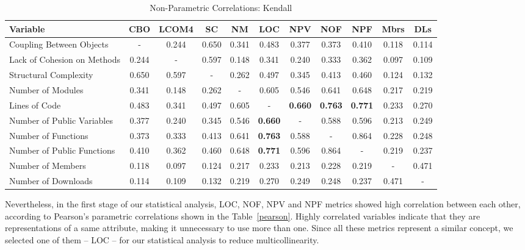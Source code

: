 \documentclass[conference]{IEEEtran}
\begin{document}
\begin{center}
\begin{table}[bt]
\centering \caption{Non-Parametric Correlations: Kendall}
\begin{tabular}{|l|c|c|c|c|c|c|c|c|c|c|} \hline

\textbf{Variable} 	    & CBO & LCOM4 & SC & NM & LOC & NPV & NOF & NPF & Mbrs & DLs
\\ \hline
Coupling Between Objects      & - & 0.244 & 0.650 & 0.341 & 0.483 & 0.377 & 0.373 & 0.410 & 0.118 & 0.114
\\ \hline
Lack of Cohesion on Methods & 0.244 & - & 0.597 & 0.148 & 0.341 & 0.240 & 0.333 & 0.362 & 0.097 & 0.109
\\ \hline
Structural Complexity       & 0.650 & 0.597 & - & 0.262 & 0.497 & 0.345 & 0.413 & 0.460 & 0.124 & 0.132
\\ \hline
Number of Modules           & 0.341 & 0.148 & 0.262 & - & 0.605 & 0.546 & 0.641 & 0.648 & 0.217 & 0.219
\\ \hline
Lines of Code               & 0.483 & 0.341 & 0.497 & 0.605 & - & \textbf{0.660} & \textbf{0.763} & \textbf{0.771} & 0.233 & 0.270
\\ \hline
Number of Public Variables  & 0.377 & 0.240 & 0.345 & 0.546 & \textbf{0.660} & - & 0.588 & 0.596 & 0.213 & 0.249
\\ \hline
Number of Functions         & 0.373 & 0.333 & 0.413 & 0.641 & \textbf{0.763} & 0.588 & - & 0.864 & 0.228 & 0.248
\\ \hline
Number of Public Functions  & 0.410 & 0.362 & 0.460 & 0.648 & \textbf{0.771} & 0.596 & 0.864 & - & 0.219 & 0.237
\\ \hline
Number of Members           & 0.118 & 0.097 & 0.124 & 0.217 & 0.233 & 0.213 & 0.228 & 0.219 & - & 0.471
\\ \hline
Number of Downloads         & 0.114 & 0.109 & 0.132 & 0.219 & 0.270 & 0.249 & 0.248 & 0.237 & 0.471 & -
\\ \hline
\end{tabular}
\label{kendall}
\end{table}
\end{center}

Nevertheless, in the first stage of our statistical analysis, LOC, NOF, NPV and NPF metrics 
showed high correlation between each other, according to Pearson's
parametric correlations shown in the Table~\ref{pearson}.
%
Highly correlated variables indicate that they are representations of
a same attribute, making it unnecessary to use more than one.
%
Since all these metrics represent a similar concept, we selected one of them -- LOC -- 
for our statistical analysis to reduce multicollinearity.
\end{document}
